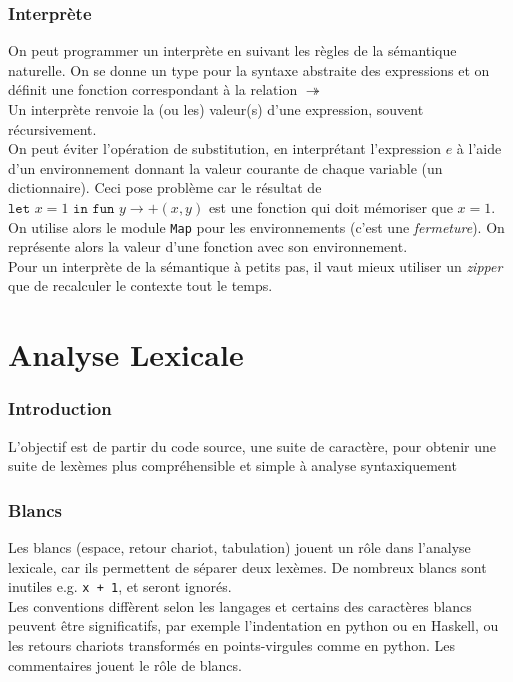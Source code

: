 \documentclass{cours}
\begin{document}
\section{Interprète}
On peut programmer un interprète en suivant les règles de la sémantique naturelle. On se donne un type pour la syntaxe abstraite des expressions et on définit une fonction correspondant à la relation $\twoheadrightarrow$\\
Un interprète renvoie la (ou les) valeur(s) d'une expression, souvent récursivement.\\
On peut éviter l'opération de substitution, en interprétant l'expression $e$ à l'aide d'un environnement donnant la valeur courante de chaque variable (un dictionnaire). Ceci pose problème car le résultat de $\texttt{let } x = 1 \texttt{ in fun } y \rightarrow +(x, y)$ est une fonction qui doit \og mémoriser \fg que $x = 1$.\\
On utilise alors le module \texttt{Map} pour les environnements (c'est une \textit{fermeture}). On représente alors la valeur d'une fonction avec son environnement. \\
Pour un interprète de la sémantique à petits pas, il vaut mieux utiliser un \textit{zipper} que de recalculer le contexte tout le temps.

\newpage
\part{Analyse Lexicale}
\localtableofcontents
\section*{Introduction}
L'objectif est de partir du code source, une suite de caractère, pour obtenir une suite de lexèmes plus compréhensible et simple à analyse syntaxiquement

\section{Blancs}
Les blancs (espace, retour chariot, tabulation) jouent un rôle dans l'analyse lexicale, car ils permettent de séparer deux lexèmes. De nombreux blancs sont inutiles e.g. \texttt{x + 1}, et seront ignorés.\\
Les conventions diffèrent selon les langages et certains des caractères blancs peuvent être significatifs, par exemple l'indentation en python ou en Haskell, ou les retours chariots transformés en points-virgules comme en python. Les commentaires jouent le rôle de blancs.
\end{document}
